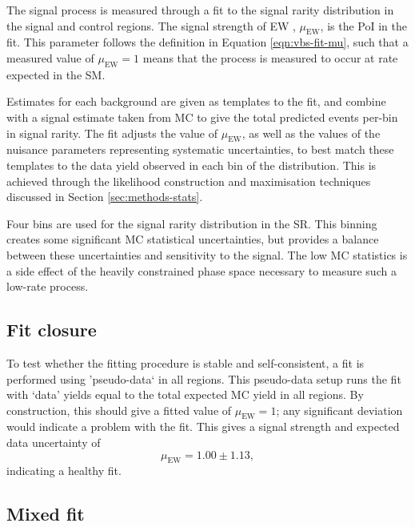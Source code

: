 
\newcommand\muEW{\ensuremath{\mu_{\text{EW}}}\xspace}
The signal process is measured through a fit to the signal rarity distribution
in the signal and control regions. The signal strength of \ac{EW} \VZy,
\muEW, is the \ac{PoI} in the fit. This parameter follows the
definition in Equation \ref{eqn:vbs-fit-mu}, such that a measured value of
$\muEW = 1$ means that the process is measured to occur at rate expected in the
\ac{SM}.

Estimates for each background are given as templates to the fit, and combine
with a signal estimate taken from \ac{MC} to give the total predicted events
per-bin in signal rarity. The fit adjusts the value of \muEW, as well as the
values of the nuisance parameters representing systematic uncertainties, to best
match these templates to the data yield observed in each bin of the
distribution. This is achieved through the likelihood construction and
maximisation techniques discussed in Section \ref{sec:methods-stats}.

Four bins are used for the signal rarity distribution in the \ac{SR}. This
binning creates some significant \ac{MC} statistical uncertainties, but provides
a balance between these uncertainties and sensitivity to the signal. The low
\ac{MC} statistics is a side effect of the heavily constrained phase space
necessary to measure such a low-rate process.

\subsection{Fit closure}

To test whether the fitting procedure is stable and self-consistent, a fit is
performed using 'pseudo-data` in all regions. This pseudo-data setup runs the
fit with `data' yields equal to the total expected \ac{MC} yield in all regions.
By construction, this should give a fitted value of $\muEW = 1$; any significant
deviation would indicate a problem with the fit. This gives a signal strength
and expected data uncertainty of
%
\begin{equation*}
  \muEW = 1.00 \pm 1.13,
\end{equation*}
%
indicating a healthy fit.

\subsection{Mixed fit}
\label{sec:vzy-fit-mixed}

